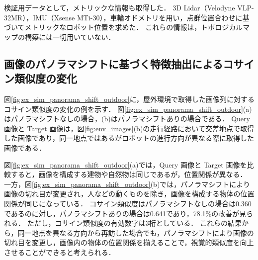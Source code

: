 \documentclass[conference]{IEEEtran}
\begin{document}
検証用データとして，メトリックな情報も取得した．
3D Lidar（Velodyne VLP-32MR），IMU（Xsense MTi-30），車輪オドメトリを用い，点群位置合わせに基づいてメトリックなロボット位置を求めた．
これらの情報は，トポロジカルマップの構築には一切用いていない．


\subsection{画像のパノラマシフトに基づく特徴抽出によるコサイン類似度の変化}
\label{sec:ex_panorama_shift}


図\ref{fig:ex_sim_panorama_shift_outdoor}に，屋外環境で取得した画像列に対するコサイン類似度の変化の例を示す．
図\ref{fig:ex_sim_panorama_shift_outdoor}(a)はパノラマシフトなしの場合，(b)はパノラマシフトありの場合である．
Query 画像と Target 画像は，図\ref{fig:env_images}(b)の走行経路において交差地点で取得した画像であり，同一地点ではあるがロボットの進行方向が異なる際に取得した画像である．

図\ref{fig:ex_sim_panorama_shift_outdoor}(a)では，Query 画像と Target 画像を比較すると，画像を構成する建物や自然物は同じであるが，位置関係が異なる．
一方，図\ref{fig:ex_sim_panorama_shift_outdoor}(b)では，パノラマシフトにより画像の切れ目が変更され，人などの動くものを除き，画像を構成する物体の位置関係が同じになっている．
コサイン類似度はパノラマシフトなしの場合は0.360であるのに対し，パノラマシフトありの場合は0.641であり，78.1\%の改善が見られる．
ただし，コサイン類似度の有効数字は3桁としている．
これらの結果から，同一地点を異なる方向から再訪した場合でも，パノラマシフトにより画像の切れ目を変更し，画像内の物体の位置関係を揃えることで，視覚的類似度を向上させることができると考えられる．
\end{document}
